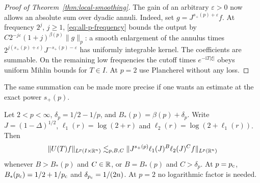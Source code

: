 \begin{proof}[Proof of Theorem~\ref{thm:local-smoothing}]
The gain of an arbitrary $\varepsilon>0$ now allows an absolute
sum over dyadic annuli. Indeed, set $g=J^{s_+(p)+\varepsilon}f$.
At frequency $2^j$, $j\ge1$, \eqref{eq:all-p-frequency} bounds the
output by $C2^{-j\varepsilon}(1+j)^{\beta(p)}\|g\|_p$: a smooth
enlargement of the annulus times $2^{j(s_+(p)+\varepsilon)}
J^{-s_+(p)-\varepsilon}$ has uniformly integrable kernel.
The coefficients are summable. On the remaining low frequencies the
cutoff times $e^{-\mathrm iT|\xi|}$ obeys uniform Mihlin bounds for
$T\in I$. At $p=2$ use Plancherel without any loss.
\end{proof}

The same summation can be made more precise if one wants an estimate
at the exact power $s_+(p)$.

\begin{corollary}\label{cor:log-sobolev}
Let $2<p<\infty$, $\delta_p=1/2-1/p$, and $B_*(p)=\beta(p)+\delta_p$.
Write $J=(1-\Delta)^{1/2}$, $\ell_1(r)=\log(2+r)$ and
$\ell_2(r)=\log(2+\ell_1(r))$. Then
\begin{equation}\label{eq:log-sobolev-summed}
 \|U(T) f\|_{L^p(I\times\mathbb R^n)}
 \lesssim_{p,B,C} \|J^{s_+(p)}\ell_1(J)^B\ell_2(J)^C f\|_{L^p(\mathbb R^n)}
\end{equation}
whenever $B>B_*(p)$ and $C\in\mathbb R$, or $B=B_*(p)$ and $C>\delta_p$.
At $p=p_{\mathrm c}$, $B_*(p_{\mathrm c})=1/2+1/p_{\mathrm c}$ and $\delta_{p_{\mathrm c}}=1/(2n)$.
At $p=2$ no logarithmic factor is needed.
\end{corollary}

